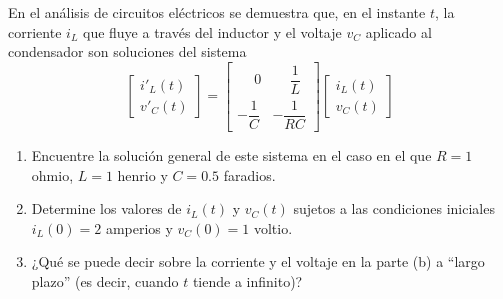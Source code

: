 \begin{enumerate}[resume]
    En el análisis de circuitos eléctricos se demuestra que, en el instante $t$, la corriente $i_L$ que fluye a través del inductor y el voltaje $v_C$ aplicado al condensador son soluciones del sistema
    $$\begin{bmatrix} i'_L(t) \\[1.5mm] v'_C(t) \end{bmatrix} = \begin{bmatrix} \phantom{-}0 & \phantom{-}\dfrac{1}{L} \\[2.5mm] -\dfrac{1}{C} & -\dfrac{1}{RC} \end{bmatrix} \begin{bmatrix} i_L(t) \\[1.5mm] v_C(t) \end{bmatrix}$$
    \begin{enumerate}
        \item Encuentre la solución general de este sistema en el caso en el que $R = 1$ ohmio, $L = 1$ henrio y $C = 0.5$ faradios.
        \item Determine los valores de $i_L(t)$ y $v_C(t)$ sujetos a las condiciones iniciales $i_L(0) = 2$ amperios y $v_C(0) = 1$ voltio.
        \item ¿Qué se puede decir sobre la corriente y el voltaje en la parte (b) a “largo plazo” (es decir, cuando $t$ tiende a infinito)?
    \end{enumerate}
\end{enumerate}